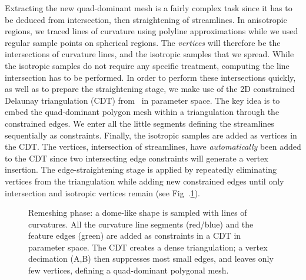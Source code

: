 Extracting the new quad-dominant mesh is a fairly complex task since
it has to be deduced from intersection, then straightening of
streamlines.  In anisotropic regions, we traced lines of curvature
using polyline approximations while we used regular sample points on
spherical regions. The \emph{vertices\/} will therefore be the
intersections of curvature lines, and the isotropic samples that we
spread. While the isotropic samples do not require any specific
treatment, computing the line intersection has to be performed.  In
order to perform these intersections quickly, as well as to prepare
the straightening stage, we make use of the 2D constrained Delaunay
triangulation (CDT) from \cgal\ in parameter space. The key idea is to
embed the quad-dominant polygon mesh within a triangulation through
the constrained edges. We enter all the little segments defining the
streamlines sequentially as constraints.  Finally, the isotropic
samples are added as vertices in the CDT. The vertices, intersection
of streamlines, have \emph{automatically\/} been added to the CDT
since two intersecting edge constraints will generate a vertex
insertion. The edge-straightening stage is applied by repeatedly
eliminating vertices from the triangulation while adding new
constrained edges until only intersection and isotropic vertices
remain (see Fig~.\ref{fig:trimming}).

\begin{figure}
  \centering
  \caption{Remeshing phase: a dome-like shape is sampled with lines of
  curvatures. All the curvature line segments (red/blue) and the
  feature edges (green) are added as constraints in a CDT in parameter
  space. The CDT creates a dense triangulation; a vertex
  decimation (A,B) then suppresses most small edges, and leaves only
  few vertices, defining a quad-dominant polygonal mesh.}
  \label{fig:trimming}
\end{figure}


